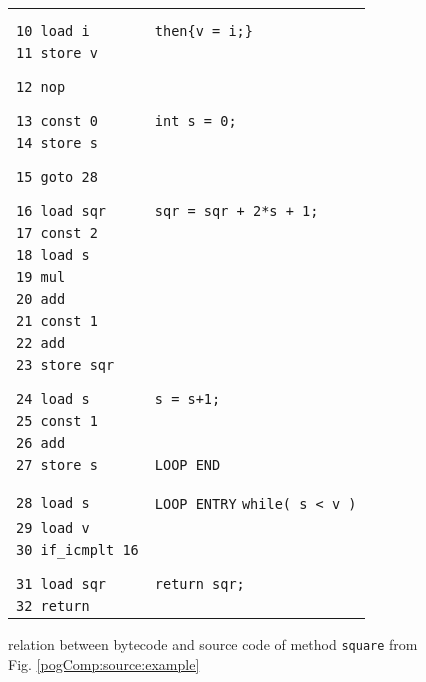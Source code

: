 \begin{figure}[ht!]
\begin{frameit}
{\begin{tabular}{ll}
                           & \\ & \\
\lstinline!10 load i!	   &\Myspace \lstinline!then{v = i;}! \\ 
\lstinline!11 store v!	   & \\  
                           & \\ & \\
\lstinline!12 nop!	   & \\  
                           & \\ & \\
\lstinline!13 const 0!	   & \lstinline!int s = 0;! \\
\lstinline!14 store s!	   & \\ 
                           & \\ & \\
\lstinline!15 goto 28!	   & \\ 
	                   & \\ & \\
\lstinline!16 load sqr!      &\Myspace \lstinline!sqr = sqr + 2*s + 1;! \\ 
\lstinline!17 const 2!	   & \\ 
\lstinline!18 load s!	   & \\ 
\lstinline!19 mul!	   & \\        
\lstinline!20 add!	   & \\ 
\lstinline!21 const 1!	   & \\ 
\lstinline!22 add!	   & \\ 
\lstinline!23 store sqr!   & \\ 
                           & \\ & \\

\lstinline!24 load s!      & \Myspace \lstinline!s = s+1;! \\
\lstinline!25 const 1!	   & \\ 
\lstinline!26 add!	   & \\ 
\lstinline!27 store s!	   & \lstinline!LOOP END! \\ 
                           & \\  & \\ 

\lstinline!28 load s!      & \lstinline!LOOP ENTRY!  \lstinline!while( s < v )!\\ 
\lstinline!29 load v!      & \\  
\lstinline!30 if_icmplt 16!& \\  
                           & \\  & \\ 
\lstinline!31 load sqr!      &\lstinline!return sqr;!\\ 
\lstinline!32 return!      &\\
  \end{tabular}

}

  \caption{\sc  relation between bytecode and source code of method \lstinline!square! from Fig. \ref{pogComp:source:example} }
  \label{pogEquiv:compile:prop}
\end{frameit}  
\end{figure}
